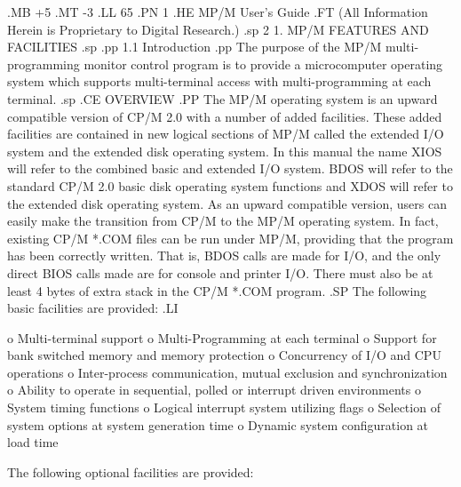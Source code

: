 .MB +5
.MT -3
.LL 65
.PN 1
.HE MP/M User's Guide
.FT   (All Information Herein is Proprietary to Digital Research.)
.sp 2
1.  MP/M FEATURES AND FACILITIES
.sp
.pp
1.1  Introduction
.pp
The purpose of the MP/M multi-programming monitor control program is to
provide a microcomputer operating system which
supports multi-terminal access with multi-programming at each terminal.
.sp
.CE
OVERVIEW
.PP
The MP/M operating system is an upward compatible
version of CP/M 2.0 with a number of added facilities.  These added
facilities are contained in new logical sections of MP/M called the
extended I/O system and the extended
disk operating system.
In this manual the name XIOS will refer to the combined basic
and extended I/O system.  BDOS will refer to the standard CP/M 2.0
basic disk operating system functions and XDOS will refer to the
extended disk operating system.
As an upward compatible version, users can
easily make the transition from CP/M to the MP/M
operating system.
In fact, existing CP/M *.COM files can be run under MP/M,
providing that the program has been correctly written.  That is,
BDOS calls are made for I/O,
and the only direct BIOS calls made are for console and printer I/O.
There must also be at least 4 bytes of extra stack in the CP/M
*.COM program.
.SP
The following basic facilities are provided:
.LI

      o Multi-terminal support
      o Multi-Programming at each terminal
      o Support for bank switched memory and
          memory protection
      o Concurrency of I/O and CPU operations
      o Inter-process communication, mutual
          exclusion and synchronization
      o Ability to operate in sequential, polled
          or interrupt driven environments
      o System timing functions
      o Logical interrupt system utilizing flags
      o Selection of system options at system
          generation time
      o Dynamic system configuration at load time

The following optional facilities are provided:

